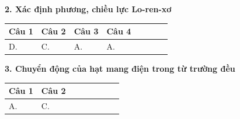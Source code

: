 \textbf{2. Xác định phương, chiều lực Lo-ren-xơ}

\begin{longtable}[\textwidth]{|p{}|p{}|p{}|p{}|p{}|p{}|p{}|p{}|}
	\hline%
	\multicolumn{1}{|c}{\textbf{Câu 1}} & \multicolumn{1}{|c|}{\textbf{Câu 2}} & \multicolumn{1}{c|}{\textbf{Câu 3}} &
	\multicolumn{1}{c|}{\textbf{Câu 4}} &
	\multicolumn{1}{c|}{\textbf{}} &
	\multicolumn{1}{c|}{\textbf{}} &
	\multicolumn{1}{c|}{\textbf{}} &
	\multicolumn{1}{c|}{\textbf{}}\\
	\hline
	D.&C. &A. &A. & & & &	\\
	\hline
\end{longtable}

\textbf{3. Chuyển động của hạt mang điện trong từ trường đều}

\begin{longtable}[\textwidth]{|p{}|p{}|p{}|p{}|p{}|p{}|p{}|p{}|}
	\hline%
	\multicolumn{1}{|c}{\textbf{Câu 1}} & \multicolumn{1}{|c|}{\textbf{Câu 2}} & \multicolumn{1}{c|}{\textbf{}} &
	\multicolumn{1}{c|}{\textbf{}} &
	\multicolumn{1}{c|}{\textbf{}} &
	\multicolumn{1}{c|}{\textbf{}} &
	\multicolumn{1}{c|}{\textbf{}} &
	\multicolumn{1}{c|}{\textbf{}}\\
	\hline
	A.&C. & & & & & &	\\
	\hline
\end{longtable}










